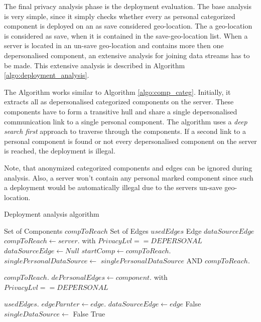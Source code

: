 The final privacy analysis phase is the deployment evaluation. The base analysis is very simple, since it simply checks whether every as personal categorized component is deployed on an as save considered geo-location. The a geo-location is considered as save, when it is contained in the save-geo-location list. When a server is located in an un-save geo-location and contains more then one depersonalised component, an extensive analysis for joining data streams has to be made. This extensive analysis is described in Algorithm \autoref{algo:deployment_analysis}.

The Algorithm works similar to Algorithm \ref{algo:comp_categ}. Initially, it extracts all as depersonalised categorized components on the server. These components have to form a transitive hull and share a single depersonalised communication link to a single personal component. The algorithm uses a \textit{deep search first} approach to traverse through the components. If a second link to a personal component is found or not every depersonalised component on the server is reached, the deployment is illegal.

Note, that anonymized categorized components and edges can be ignored during analysis. Also, a server won't contain any personal marked component since such a deployment would be automatically illegal due to the servers un-save geo-location.


\begin{algorithm}[h]
	\caption{Deployment analysis algorithm}
	\label{algo:deployment_analysis}
	\begin{algorithmic}[1]
		
		\State Set of Components $compToReach$
		\State Set of Edges $usedEdges$
		\State Edge $dataSourceEdge$
		\State
			\State $compToReach\gets server.$ with $PrivacyLvl == DEPERSONAL$
			\State $dataSourceEdge \gets Null$
			\State $startComp\gets compToReach.$
			\State $singlePersonalDataSource\gets $
			\State \Return $singlePersonalDataSource$ AND $compToReach.$ 
		\EndProcedure \State
		
		
		\State $compToReach.$ 
		\State $dePersonalEdges\gets component.$ with $PrivacyLvl == DEPERSONAL$\State
		
				\State {}
			\Else 
				\State $usedEdges.$ 
				\State $edgeParnter\gets edge.$ 
				\State
					 	\State $dataSourceEdge \gets edge$
				 	\Else 
					 	\State \Return False
				 	\EndIf
				\Else \State
					$singleDataSource\gets$ 
						\State \Return False
					\EndIf
				\EndIf 
			\EndIf
		\EndFor 
		\State \Return True
		\EndFunction
	\end{algorithmic}
\end{algorithm}


